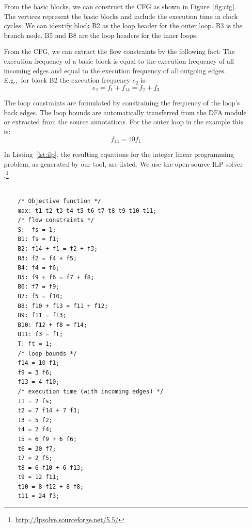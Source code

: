 From the basic blocks, we can construct the CFG as shown in
Figure~\ref{fig:cfg}. The vertices represent the basic blocks and
include the execution time in clock cycles. We can identify block B2
as the loop header for the outer loop. B3 is the branch node. B5 and
B8 are the loop headers for the inner loops.


From the CFG, we can extract the flow constraints by the following
fact: The execution frequency of a basic block is equal to the
execution frequency of all incoming edges and equal to the execution
frequency of all outgoing edges. E.g.,\ for block B2 the execution
frequency $e_2$ is:
\begin{equation*}
    e_2 = f_{1} + f_{14} = f_{2} + f_{3}
\end{equation*}


The loop constraints are formulated by constraining the frequency of
the loop's back edges. The loop bounds are automatically transferred
from the DFA module or extracted from the source annotations. For the
outer loop in the example this is:
\begin{equation*}
    f_{14} = 10 f_1
\end{equation*}


In Listing~\ref{lst:ilp}, the resulting equations for the integer
linear programming problem, as generated by our tool, are listed. We
use the open-source ILP solver
.\footnote{\url{http://lpsolve.sourceforge.net/5.5/}}


\begin{lstlisting}[float, caption={ILP equations of the example},label=lst:ilp]

    /* Objective function */
    max: t1 t2 t3 t4 t5 t6 t7 t8 t9 t10 t11;
    /* flow constraints */
    S:  fs = 1;
    B1: fs = f1;
    B2: f14 + f1 = f2 + f3;
    B3: f2 = f4 + f5;
    B4: f4 = f6;
    B5: f9 + f6 = f7 + f8;
    B6: f7 = f9;
    B7: f5 = f10;
    B8: f10 + f13 = f11 + f12;
    B9: f11 = f13;
    B10: f12 + f8 = f14;
    B11: f3 = ft;
    T: ft = 1;
    /* loop bounds */
    f14 = 10 f1;
    f9 = 3 f6;
    f13 = 4 f10;
    /* execution time (with incoming edges) */
    t1 = 2 fs;
    t2 = 7 f14 + 7 f1;
    t3 = 5 f2;
    t4 = 2 f4;
    t5 = 6 f9 + 6 f6;
    t6 = 30 f7;
    t7 = 2 f5;
    t8 = 6 f10 + 6 f13;
    t9 = 12 f11;
    t10 = 8 f12 + 8 f8;
    t11 = 24 f3;
\end{lstlisting}


